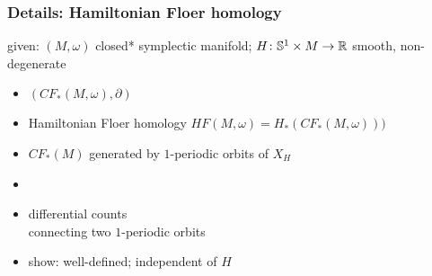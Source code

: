 \begin{frame}
  \frametitle{Details: Hamiltonian Floer homology}
  given: $(M,\omega)$ closed* symplectic manifold; $H\colon \mathbb{S}^{1}\times M\to \mathbb{R}$ smooth, non-degenerate%
  \begin{itemize}
    \item {} $(CF_*(M,\omega),\partial)$
    \item Hamiltonian Floer homology $HF(M,\omega)=H_*(CF_*(M,\omega)))$
    \item $CF_*(M)$ generated by $1$-periodic orbits of $X_H$
    \item {}
    \item differential counts  \\connecting two $1$-periodic orbits
    \item show: well-defined; independent of $H$
  \end{itemize}
\end{frame}
